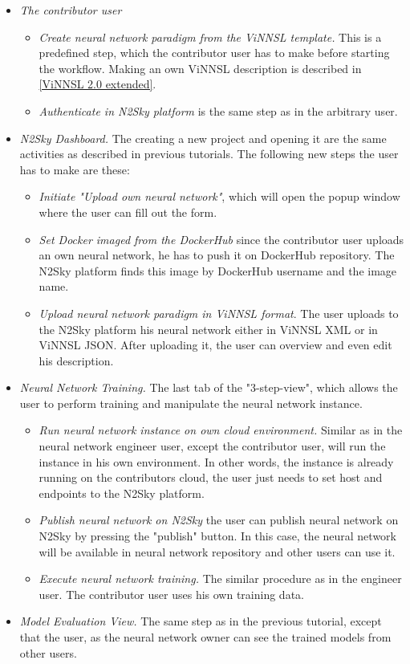 \begin{itemize}
\item \emph{The contributor user} 
\begin{itemize}
\item \emph{Create neural network paradigm from the ViNNSL template.} This is a predefined step, which the contributor user has to make before starting the workflow. Making an own ViNNSL description is described in \autoref{ViNNSL 2.0 extended}.
\item \emph{Authenticate in N2Sky platform} is the same step as in the arbitrary user.
\end{itemize}
\item \emph{N2Sky Dashboard.} The creating a new project and opening it are the same activities as described in previous tutorials. The following new steps the user has to make are these:
\begin{itemize}
\item \emph{Initiate "Upload own neural network"}, which will open the popup window where the user can fill out the form.
\item \emph{Set Docker imaged from the DockerHub} since the contributor user uploads an own neural network, he has to push it on DockerHub repository. The N2Sky platform finds this image by DockerHub username and the image name.
\item \emph{Upload neural network paradigm in ViNNSL format}. The user uploads to the N2Sky platform his neural network either in ViNNSL XML or in ViNNSL JSON. After uploading it, the user can overview and even edit his description.
\end{itemize}
\item \emph{Neural Network Training.} The last tab of the "3-step-view", which allows the user to perform training and manipulate the neural network instance.
\begin{itemize}
\item \emph{Run neural network instance on own cloud environment.} Similar as in the neural network engineer user, except the contributor user, will run the instance in his own environment. In other words, the instance is already running on the contributors cloud, the user just needs to set host and endpoints to the N2Sky platform.
\item \emph{Publish neural network on N2Sky} the user can publish neural network on N2Sky by pressing the "publish" button. In this case, the neural network will be available in neural network repository and other users can use it.
\item \emph{Execute neural network training.} The similar procedure as in the engineer user. The contributor user uses his own training data.
\end{itemize}
\item \emph{Model Evaluation View.} The same step as in the previous tutorial, except that the user, as the neural network owner can see the trained models from other users.

\end{itemize}

